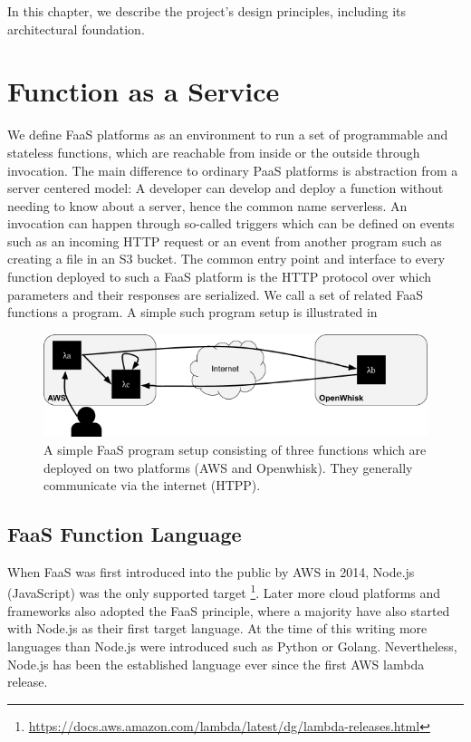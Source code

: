 \documentclass[../main.tex]{subfiles}
\begin{document}
In this chapter, we describe the project's design principles,
including its architectural foundation.

\section{Function as a Service}\label{sec:FaaS}

We define FaaS platforms as an environment to run a set of programmable and stateless functions,
which are reachable from inside or the outside through invocation. 
The main difference to ordinary PaaS platforms is abstraction from a server centered model: 
A developer can develop and deploy a function without needing to know about a server, hence the common name serverless. 
An invocation can happen through so-called triggers which can be defined on events 
such as an incoming HTTP request or an event from another program such as creating a file in an S3 bucket. 
The common entry point and interface to every function deployed to such a FaaS platform is the HTTP protocol 
over which parameters and their responses are serialized. 
We call a set of related FaaS functions a program. A simple such program setup is illustrated in 

\begin{figure}
\begin{center}
  \includegraphics[width=\linewidth,keepaspectratio]{./3-functions.png}
\end{center}
\caption[Simple FaaS Program Setup]{A simple FaaS program setup consisting of three functions which are deployed on two platforms (AWS and Openwhisk). 
They generally communicate via the internet (HTPP).}%
\label{fig:frameworkSimpleProgramSetup}
\end{figure}

\subsection{FaaS Function Language}%
\label{sub:FaaSLanguage}

When FaaS was first introduced into the public by AWS in 2014, Node.js (JavaScript) was the only supported target%
\footnote{\url{https://docs.aws.amazon.com/lambda/latest/dg/lambda-releases.html}}. 
Later more cloud platforms and frameworks also adopted the FaaS principle, 
where a majority have also started with Node.js as their first target language. 
At the time of this writing more languages than Node.js were introduced such as Python or Golang. 
Nevertheless, Node.js has been the established language ever since the first AWS lambda release.
\end{document}
